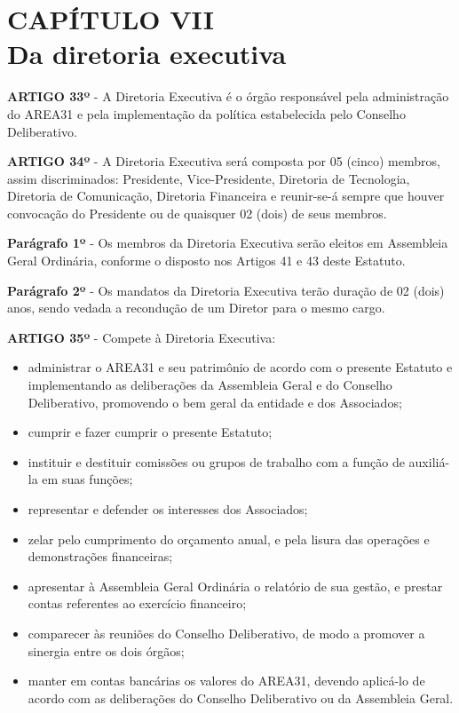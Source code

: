 \chapter*{CAPÍTULO VII \\ Da diretoria executiva}


\textbf{ARTIGO 33º} - A Diretoria Executiva é o órgão responsável pela 
administração do AREA31 e pela implementação da política 
estabelecida pelo Conselho Deliberativo.

\bigskip

\textbf{ARTIGO 34º} - A Diretoria Executiva será composta por 05 (cinco) 
membros, assim discriminados: Presidente, Vice-Presidente, Diretoria de 
Tecnologia, Diretoria de Comunicação, Diretoria Financeira e reunir-se-á 
sempre que houver convocação do Presidente ou de quaisquer 
02 (dois) de seus membros.

\bigskip

\textbf{Parágrafo 1º} - Os membros da Diretoria Executiva serão eleitos em 
Assembleia Geral Ordinária, conforme o disposto nos Artigos 41 
e 43 deste Estatuto. 

\bigskip

\textbf{Parágrafo 2º} - Os mandatos da Diretoria Executiva terão duração de 
02 (dois) anos, sendo vedada a recondução de um Diretor para o mesmo cargo.

\bigskip

\textbf{ARTIGO 35º} - Compete à Diretoria Executiva:

\begin{itemize}
    \item administrar o AREA31 e seu patrimônio de acordo com o presente 
        Estatuto e implementando as deliberações da Assembleia Geral e do 
        Conselho Deliberativo, promovendo o bem geral da 
        entidade e dos Associados;
    \item cumprir e fazer cumprir o presente Estatuto;
    \item instituir e destituir comissões ou grupos de trabalho com a 
        função de auxiliá-la em suas funções;
    \item representar e defender os interesses dos Associados;
    \item zelar pelo cumprimento do orçamento anual, e pela lisura das 
        operações e demonstrações financeiras;
    \item apresentar à Assembleia Geral Ordinária o relatório de sua 
        gestão, e prestar contas referentes ao exercício financeiro;
    \item comparecer às reuniões do Conselho Deliberativo, 
        de modo a promover a sinergia entre os dois órgãos;
    \item manter em contas bancárias os valores do AREA31, devendo aplicá-lo 
        de acordo com as deliberações do Conselho Deliberativo 
        ou da Assembleia Geral.
\end{itemize}

